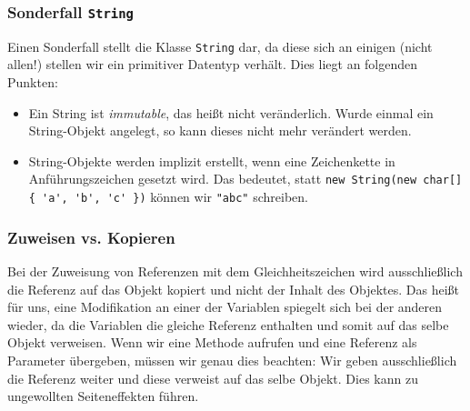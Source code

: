 	\subsubsection{Sonderfall \texttt{String}}
		Einen Sonderfall stellt die Klasse \lstinline|String| dar, da diese sich an einigen (nicht allen!) stellen wir ein primitiver Datentyp verhält. Dies liegt an folgenden Punkten:
		\begin{itemize}
			\item Ein String ist \textit{immutable}, das heißt nicht veränderlich. Wurde einmal ein String-Objekt angelegt, so kann dieses nicht mehr verändert werden.
			\item String-Objekte werden implizit erstellt, wenn eine Zeichenkette in Anführungszeichen gesetzt wird. Das bedeutet, statt \lstinline|new String(new char[] { 'a', 'b', 'c' })| können wir \lstinline|"abc"| schreiben.
		\end{itemize}
	
	
	\subsubsection{Zuweisen vs. Kopieren}
		\label{sec:assign_copy}
		
		Bei der Zuweisung von Referenzen mit dem Gleichheitszeichen wird ausschließlich die Referenz auf das Objekt kopiert und nicht der Inhalt des Objektes. Das heißt für uns, eine Modifikation an einer der Variablen spiegelt sich bei der anderen wieder, da die Variablen die gleiche Referenz enthalten und somit auf das selbe Objekt verweisen. Wenn wir eine Methode aufrufen und eine Referenz als Parameter übergeben, müssen wir genau dies beachten: Wir geben ausschließlich die Referenz weiter und diese verweist auf das selbe Objekt. Dies kann zu ungewollten Seiteneffekten führen.
		

